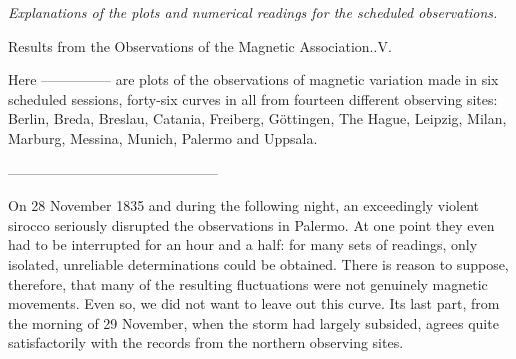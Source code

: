 \begin{center}\large\textit{Explanations of the plots and numerical readings for the scheduled observations.}\par
[\textit{An excerpt.}]\end{center}
\begin{center}\small Results from the Observations of the Magnetic Association..\quad V.\end{center}

Here ---\quad---\quad---\quad---\quad--- are plots of the observations of magnetic variation made in six scheduled sessions, forty-six curves in all from fourteen different observing sites: Berlin, Breda, Breslau, Catania, Freiberg, Göttingen, The Hague, Leipzig, Milan, Marburg, Messina, Munich, Palermo and Uppsala.
\begin{center}\small
---\enspace---\enspace---\enspace---\enspace---\enspace---\enspace---\enspace---\enspace---\enspace---\enspace---\enspace---\enspace---\enspace---\enspace---
\end{center}
On 28 November 1835 and during the following night, an exceedingly violent sirocco seriously disrupted the observations in Palermo. At one point they even had to be interrupted for an hour and a half:
for many sets of readings, only isolated, unreliable determinations could be obtained. There is reason to suppose, therefore, that many of the resulting fluctuations were not genuinely magnetic movements. Even so, we did not want to leave out this curve. Its last part, from the morning of 29 November, when the storm had largely subsided, agrees quite satisfactorily with the records from the northern observing sites.

